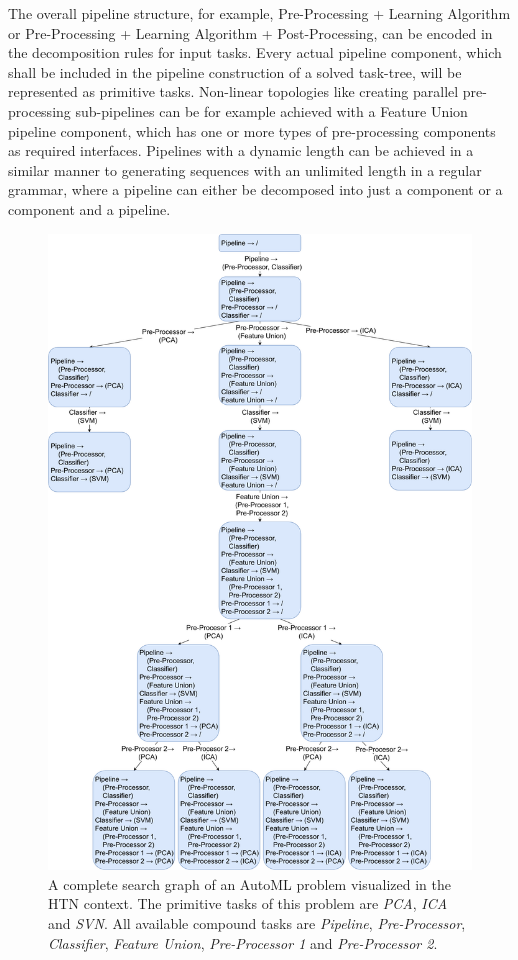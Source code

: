 The overall pipeline structure, for example, Pre-Processing + Learning Algorithm or Pre-Processing + Learning Algorithm + Post-Processing, can be encoded in the decomposition rules for input tasks.
Every actual pipeline component, which shall be included in the pipeline construction of a solved task-tree, will be represented as primitive tasks.\newline
Non-linear topologies like creating parallel pre-processing sub-pipelines can be for example achieved with a Feature Union pipeline component, which has one or more types of pre-processing components as required interfaces.
Pipelines with a dynamic length can be achieved in a similar manner to generating sequences with an unlimited length in a regular grammar, where a pipeline can either be decomposed into just a component or a component and a pipeline.
\begin{figure}[ht!]
    \centering
    \includegraphics[width=\textwidth]{gfx/Figures/Approach/HTNAutoML.pdf}
    \caption[A complete search graph of an AutoML problem visualized in the HTN context.]{A complete search graph of an AutoML problem visualized in the HTN context. The primitive tasks of this problem are \textit{PCA}, \textit{ICA} and \textit{SVN}.
    All available compound tasks are \textit{Pipeline}, \textit{Pre-Processor}, \textit{Classifier}, \textit{Feature Union}, \textit{Pre-Processor 1} and \textit{Pre-Processor 2}.}
    \label{fig:approach:htn-automl}
\end{figure}

